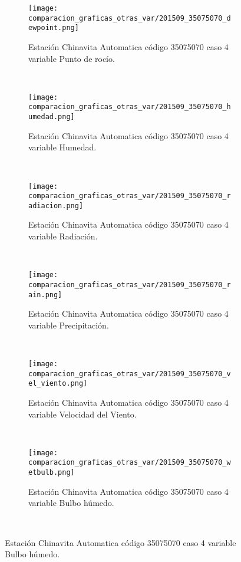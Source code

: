 \begin{figure}[H]
\centering
\begin{subfigure}[normla]{0.4\textwidth}
\caption{Estación Chinavita Automatica código 35075070 caso 4 variable Punto de rocío.}
\texttt{[image: comparacion\_graficas\_otras\_var/201509\_35075070\_dewpoint.png]}
\end{subfigure}
~
\begin{subfigure}[normla]{0.4\textwidth}
\caption{Estación Chinavita Automatica código 35075070 caso 4 variable Humedad.}
\texttt{[image: comparacion\_graficas\_otras\_var/201509\_35075070\_humedad.png]}
\end{subfigure}
~
\begin{subfigure}[normla]{0.4\textwidth}
\caption{Estación Chinavita Automatica código 35075070 caso 4 variable Radiación.}
\texttt{[image: comparacion\_graficas\_otras\_var/201509\_35075070\_radiacion.png]}
\end{subfigure}
~
\begin{subfigure}[normla]{0.4\textwidth}
\caption{Estación Chinavita Automatica código 35075070 caso 4 variable Precipitación.}
\texttt{[image: comparacion\_graficas\_otras\_var/201509\_35075070\_rain.png]}
\end{subfigure}
~
\begin{subfigure}[normla]{0.4\textwidth}
\caption{Estación Chinavita Automatica código 35075070 caso 4 variable Velocidad del Viento.}
\texttt{[image: comparacion\_graficas\_otras\_var/201509\_35075070\_vel\_viento.png]}
\end{subfigure}
~
\begin{subfigure}[normla]{0.4\textwidth}
\caption{Estación Chinavita Automatica código 35075070 caso 4 variable Bulbo húmedo.}
\texttt{[image: comparacion\_graficas\_otras\_var/201509\_35075070\_wetbulb.png]}
\end{subfigure}
~
\end{figure}
           
